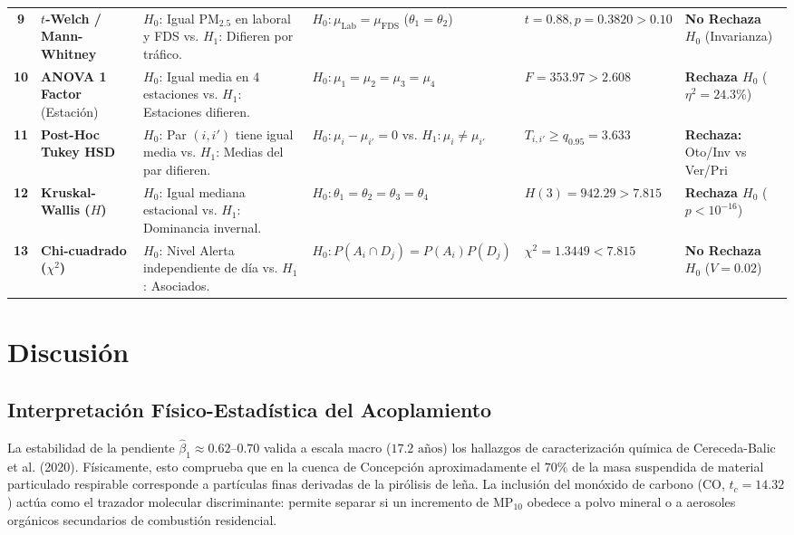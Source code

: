 \documentclass[10pt,twocolumn,a4paper]{article}
\begin{document}
\begin{table}[t]
{\begin{tabular}{clllll}
\textbf{9} & \textbf{$t$-Welch / Mann-Whitney} & $H_0$: Igual $\text{PM}_{2.5}$ en laboral y FDS vs. $H_1$: Difieren por tráfico. & $H_0: \mu_{\text{Lab}} = \mu_{\text{FDS}}$ ($\theta_1 = \theta_2$) & $t = 0.88, p = 0.3820 > 0.10$ & \textbf{No Rechaza $H_0$} (Invarianza) \\
\textbf{10} & \textbf{ANOVA 1 Factor} (Estación) & $H_0$: Igual media en 4 estaciones vs. $H_1$: Estaciones difieren. & $H_0: \mu_1=\mu_2=\mu_3=\mu_4$ & $F = 353.97 > 2.608$ & \textbf{Rechaza $H_0$} ($\eta^2 = 24.3\%$) \\
\textbf{11} & \textbf{Post-Hoc Tukey HSD} & $H_0$: Par $(i,i')$ tiene igual media vs. $H_1$: Medias del par difieren. & $H_0: \mu_i - \mu_{i'} = 0$ vs. $H_1: \mu_i \neq \mu_{i'}$ & $T_{i,i'} \ge q_{0.95} = 3.633$ & \textbf{Rechaza:} Oto/Inv vs Ver/Pri \\
\textbf{12} & \textbf{Kruskal-Wallis ($H$)} & $H_0$: Igual mediana estacional vs. $H_1$: Dominancia invernal. & $H_0: \theta_1=\theta_2=\theta_3=\theta_4$ & $H(3) = 942.29 > 7.815$ & \textbf{Rechaza $H_0$} ($p < 10^{-16}$) \\
\textbf{13} & \textbf{Chi-cuadrado ($\chi^2$)} & $H_0$: Nivel Alerta independiente de día vs. $H_1$: Asociados. & $H_0: P(A_i \cap D_j) = P(A_i)P(D_j)$ & $\chi^2 = 1.3449 < 7.815$ & \textbf{No Rechaza $H_0$} ($V = 0.02$) \\
\bottomrule
\end{tabular}
}
\vspace{-0.2cm}
\end{table}

\section{Discusión}

\subsection{Interpretación Físico-Estadística del Acoplamiento}
La estabilidad de la pendiente $\hat{\beta}_1 \approx 0.62\text{--}0.70$ valida a escala macro ($17.2\text{ años}$) los hallazgos de caracterización química de Cereceda-Balic et al. (2020). Físicamente, esto comprueba que en la cuenca de Concepción aproximadamente el $70\%$ de la masa suspendida de material particulado respirable corresponde a partículas finas derivadas de la pirólisis de leña. La inclusión del monóxido de carbono ($\text{CO}$, $t_c = 14.32$) actúa como el trazador molecular discriminante: permite separar si un incremento de $\text{MP}_{10}$ obedece a polvo mineral o a aerosoles orgánicos secundarios de combustión residencial.
\end{document}
